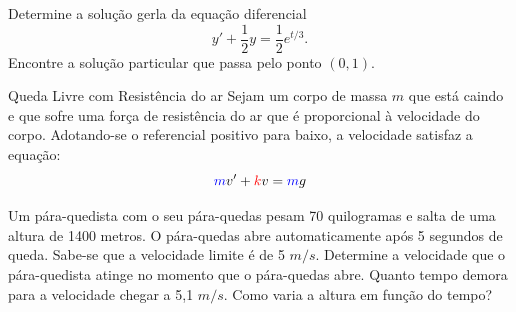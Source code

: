 \begin{frame}
\begin{exe}
Determine a solução gerla da equação diferencial
\[y'+\frac{1}{2}y=\frac{1}{2}e^{t/3}.\]
Encontre a solução particular que passa pelo ponto $(0,1)$.
\end{exe}


\begin{center}
\end{center}

\end{frame}

%	
\begin{frame}{Queda Livre com Resistência do ar}
	Sejam um corpo de massa {\color{blue} $m$} que está caindo e que sofre uma {\color{red}força de resistência do ar que é proporcional à velocidade do corpo}. Adotando-se o referencial positivo para baixo, a velocidade satisfaz a equação:
\[{\color{blue}m}v'+{\color{red}k}v={\color{blue}m}g\]
	
\begin{exe} Um pára-quedista com o seu pára-quedas pesam 70 quilogramas e salta de uma altura de 1400 metros. O pára-quedas abre automaticamente após 5 segundos de queda. Sabe-se que a velocidade limite é de 5 $m/s$. Determine a velocidade que o pára-quedista atinge no momento que o pára-quedas abre. Quanto tempo demora para a velocidade chegar a 5,1 $m/s$. Como varia a altura em função do tempo?
\end{exe}
\end{frame}

